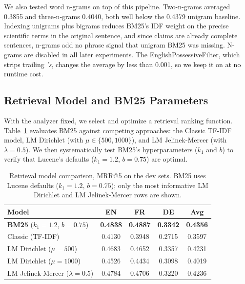 We also tested word n-grams on top of this pipeline. Two-n-grams averaged 0.3855 and three-n-grams 0.4040, both well below the 0.4379 unigram baseline. Indexing unigrams plus bigrams reduces BM25's IDF weight on the precise scientific terms in the original sentence, and since claims are already complete sentences, n-grams add no phrase signal that unigram BM25 was missing. N-grams are disabled in all later experiments. The EnglishPossessiveFilter, which strips trailing \emph{'s}, changes the average by less than 0.001, so we keep it on at no runtime cost.

\subsection{Retrieval Model and BM25 Parameters}
\label{subsec:res-model}

With the analyzer fixed, we select and optimize a retrieval ranking function. Table~\ref{tab:model-comparison} evaluates BM25 against competing approaches: the Classic TF-IDF model, LM Dirichlet (with $\mu \in \{500, 1000\}$), and LM Jelinek-Mercer (with $\lambda{=}0.5$). We then systematically test BM25's hyperparameters ($k_1$ and $b$) to verify that Lucene's defaults ($k_1{=}1.2$, $b{=}0.75$) are optimal.

\begin{table}[!ht]
    \caption{Retrieval model comparison, MRR@5 on the dev sets. BM25 uses Lucene defaults ($k_1{=}1.2$, $b{=}0.75$); only the most informative LM Dirichlet and LM Jelinek-Mercer rows are shown.}
    \label{tab:model-comparison}
    \centering
    \begin{tabular}{lcccc}
        \toprule
        Model & EN & FR & DE & Avg \\
        \midrule
        \textbf{BM25} ($k_1{=}1.2$, $b{=}0.75$)     & \textbf{0.4838} & \textbf{0.4887} & \textbf{0.3342} & \textbf{0.4356} \\
        Classic (TF-IDF)                             & 0.4130 & 0.3948 & 0.2715 & 0.3597 \\
        LM Dirichlet ($\mu{=}500$)                   & 0.4683 & 0.4652 & 0.3357 & 0.4231 \\
        LM Dirichlet ($\mu{=}1000$)                  & 0.4526 & 0.4434 & 0.3098 & 0.4019 \\
        LM Jelinek-Mercer ($\lambda{=}0.5$)          & 0.4784 & 0.4706 & 0.3220 & 0.4236 \\
        \bottomrule
    \end{tabular}
\end{table}

